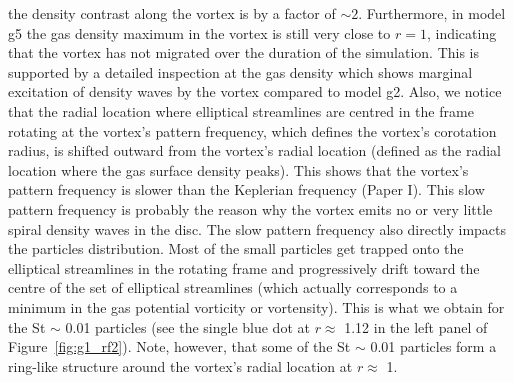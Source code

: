 \documentclass[a4paper,usenatbib]{mnras}
\begin{document}
the density contrast along the vortex is by a factor of
$\sim$$2$. Furthermore, in model g5 the gas density maximum in the
vortex is still very close to $r = 1$, indicating that the vortex has
not migrated over the duration of the simulation. This is supported by
a detailed inspection at the gas density which shows marginal
excitation of density waves by the vortex compared to model g2. Also,
we notice that the radial location where elliptical streamlines are
centred in the frame rotating at the vortex's pattern frequency, which
defines the vortex's corotation radius, is shifted outward from the
vortex's radial location (defined as the radial location where the gas
surface density peaks).  This shows that the vortex's pattern
frequency is slower than the Keplerian frequency (Paper I). This slow
pattern frequency is probably the reason why the vortex emits no or
very little spiral density waves in the disc. The slow pattern
frequency also directly impacts the particles distribution. Most of
the small particles get trapped onto the elliptical streamlines in the
rotating frame and progressively drift toward the centre of the set of
elliptical streamlines (which actually corresponds to a minimum in the
gas potential vorticity or vortensity). This is what we obtain for the
St $\sim$ 0.01 particles (see the single blue dot at $r \approx$ 1.12
in the left panel of Figure~\ref{fig:g1_rf2}).  Note, however, that
some of the St $\sim$ 0.01 particles form a ring-like structure around
the vortex's radial location at $r \approx$ 1.
\end{document}
